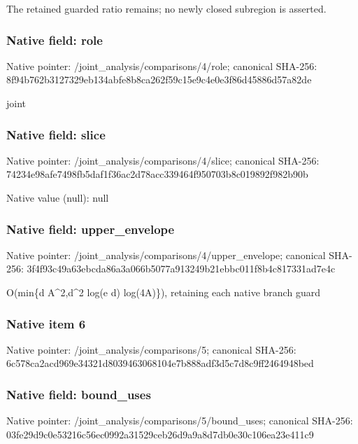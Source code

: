 \documentclass[10pt,a4paper]{article}
\begin{document}
\begingroup\raggedright\sloppy The retained guarded ratio remains;\allowbreak{} no newly closed subregion is asserted.\par\endgroup

\subsubsection{Native field: role}
Native pointer: /joint\_\allowbreak{}analysis/comparisons/4/role; canonical SHA-256: 8f94b762b3127329eb134abfe8b8ca262f59c15e9c4e0e3f86d45886d57a82de

\begingroup\raggedright\sloppy joint\par\endgroup

\subsubsection{Native field: slice}
Native pointer: /joint\_\allowbreak{}analysis/comparisons/4/slice; canonical SHA-256: 74234e98afe7498fb5daf1f36ac2d78acc339464f950703b8c019892f982b90b

Native value (null): null

\subsubsection{Native field: upper\_\allowbreak{}envelope}
Native pointer: /joint\_\allowbreak{}analysis/comparisons/4/upper\_\allowbreak{}envelope; canonical SHA-256: 3f4f93c49a63ebcda86a3a066b5077a913249b21ebbc011f8b4c817331ad7e4c

\begingroup\raggedright\sloppy O(min\{d A\textasciicircum{}2,\allowbreak{}d\textasciicircum{}2 log(e d) log(4A)\}),\allowbreak{} retaining each native branch guard\par\endgroup

\subsubsection{Native item 6}
Native pointer: /joint\_\allowbreak{}analysis/comparisons/5; canonical SHA-256: 6c578ca2acd969e34321d8039463068104e7b888adf3d5c7d8c9ff2464948bed

\subsubsection{Native field: bound\_\allowbreak{}uses}
Native pointer: /joint\_\allowbreak{}analysis/comparisons/5/bound\_\allowbreak{}uses; canonical SHA-256: 03fe29d9c0e53216c56ec0992a31529ceb26d9a9a8d7db0e30c106ea23e411c9
\end{document}

